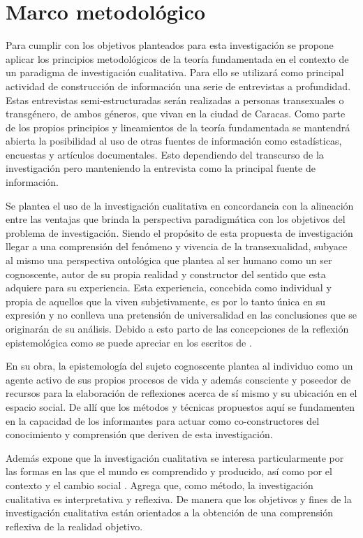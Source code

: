 \chapter{Marco metodológico}
	Para cumplir con los objetivos planteados para esta investigación se propone
aplicar los principios metodológicos de la teoría fundamentada en el contexto
de un paradigma de investigación cualitativa. Para ello se utilizará como
principal actividad de construcción de información una serie de entrevistas a
profundidad. Estas entrevistas semi-estructuradas serán realizadas a personas
transexuales o transgénero, de ambos géneros, que vivan en la ciudad de
Caracas. Como parte de los propios principios y lineamientos de la teoría
fundamentada se mantendrá abierta la posibilidad al uso de otras fuentes de
información como estadísticas, encuestas y artículos documentales. Esto
dependiendo del transcurso de la investigación pero manteniendo la entrevista
como la principal fuente de información.

	Se plantea el uso de la investigación cualitativa en concordancia con la
alineación entre las ventajas que brinda la perspectiva paradigmática con los
objetivos del problema de investigación. Siendo el propósito de esta propuesta
de investigación llegar a una comprensión del fenómeno y vivencia de la
transexualidad, subyace al mismo una perspectiva ontológica que plantea al ser
humano como un ser cognoscente, autor de su propia realidad y constructor del
sentido que esta adquiere para su experiencia. Esta experiencia, concebida como
individual y propia de aquellos que la viven subjetivamente, es por lo tanto
única en su expresión y no conlleva una pretensión de universalidad
en las conclusiones que se originarán de su análisis. Debido a esto parto de
las concepciones de la reflexión epistemológica como se puede apreciar en los
escritos de \Textcite{Gialdino2009}.

	En su obra, la epistemología del sujeto cognoscente plantea al individuo como
un agente activo de sus propios procesos de vida y además consciente y poseedor
de recursos para la elaboración de reflexiones acerca de sí mismo y su
ubicación en el espacio social. De allí que los métodos y técnicas propuestos
aquí se fundamenten en la capacidad de los informantes para actuar como
co-constructores del conocimiento y comprensión que deriven de esta
investigación.

	Además expone que la investigación cualitativa se interesa particularmente por
las formas en las que el mundo es comprendido y producido, así como por el
contexto y el cambio social \parencite[Mason 1996, c.p.]{Gialdino2009}. Agrega
que, como método, la investigación cualitativa es interpretativa y reflexiva.
De manera que los objetivos y fines de la investigación cualitativa están
orientados a la obtención de una comprensión reflexiva de la realidad objetivo.

